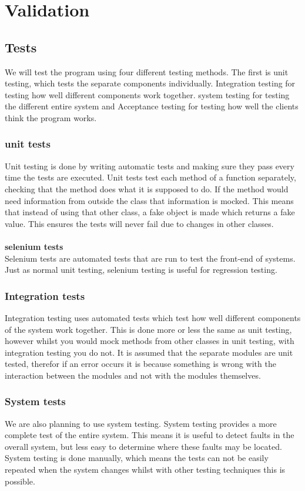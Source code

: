 \section{Validation}

\subsection{Tests}
We will test the program using four different testing methods. The first is unit testing, which tests the separate components individually. Integration testing for testing how well different components work together. system testing for testing the different entire system and Acceptance testing for testing how well the clients think the program works.

\subsubsection{unit tests}
Unit testing is done by writing automatic tests and making sure they pass every time the tests are executed. Unit tests test each method of a function separately, checking that the method does what it is supposed to do. If the method would need information from outside the class that information is mocked. This means that instead of using that other class, a fake object is made which returns a fake value. This ensures the tests will never fail due to changes in other classes. \\
\\
\textbf{selenium tests} \\
Selenium tests are automated tests that are run to test the front-end of systems. Just as normal unit testing, selenium testing is useful for regression testing.

\subsubsection{Integration tests}
Integration testing uses automated tests which test how well different components of the system work together. This is done more or less the same as unit testing, however whilst you would mock methods from other classes in unit testing, with integration testing you do not. It is assumed that the separate modules are unit tested, therefor if an error occurs it is because something is wrong with the interaction between the modules and not with the modules themselves. 

\subsubsection{System tests}
We are also planning to use system testing. System testing provides a more complete test of the entire system. This means it is useful to detect faults in the overall system, but less easy to determine where these faults may be located. System testing is done manually, which means the tests can not be easily repeated when the system changes whilst with other testing techniques this is possible.

